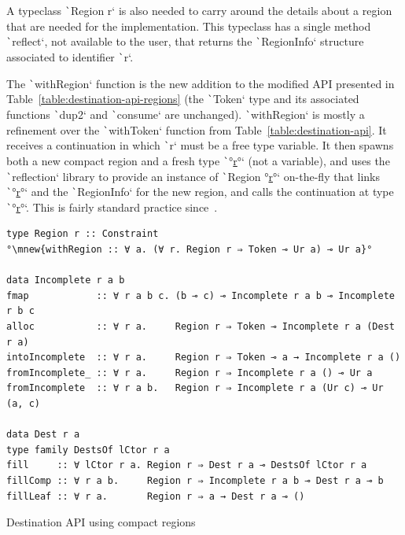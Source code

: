\documentclass[english]{jflart}
\newcommand{\mnew}[1]{\colorbox{green!50}{#1}}
\newcommand{\muline}[1]{\uline{#1}}
\begin{document}
A typeclass \texttt`Region r` is also needed to carry around the details about a region that are needed for the implementation. This typeclass has a single method \texttt`reflect`, not available to the user, that returns the \texttt`RegionInfo` structure associated to identifier \texttt`r`.

The \texttt`withRegion` function is the new addition to the modified API presented in Table~\ref{table:destination-api-regions} (the \texttt`Token` type and its associated functions \texttt`dup2` and \texttt`consume` are unchanged). \texttt`withRegion` is mostly a refinement over the \texttt`withToken` function from Table~\ref{table:destination-api}. It receives a continuation in which \texttt`r` must be a free type variable. It then spawns both a new compact region and a fresh type \texttt`°\muline{r}°` (not a variable), and uses the \texttt`reflection` library to provide an instance of \texttt`Region °\muline{r}°` on-the-fly that links \texttt`°\muline{r}°` and the \texttt`RegionInfo` for the new region, and calls the continuation at type \texttt`°\muline{r}°`. This is fairly standard practice since~\cite{launchbury_lazy_1994}.

\begin{table}[t]
\small
\begin{verbatim}
type Region r :: Constraint
°\mnew{withRegion :: ∀ a. (∀ r. Region r ⇒ Token ⊸ Ur a) ⊸ Ur a}°

data Incomplete r a b
fmap            :: ∀ r a b c. (b ⊸ c) ⊸ Incomplete r a b ⊸ Incomplete r b c
alloc           :: ∀ r a.     Region r ⇒ Token ⊸ Incomplete r a (Dest r a)
intoIncomplete  :: ∀ r a.     Region r ⇒ Token ⊸ a → Incomplete r a ()
fromIncomplete_ :: ∀ r a.     Region r ⇒ Incomplete r a () ⊸ Ur a
fromIncomplete  :: ∀ r a b.   Region r ⇒ Incomplete r a (Ur c) ⊸ Ur (a, c)

data Dest r a
type family DestsOf lCtor r a
fill     :: ∀ lCtor r a. Region r ⇒ Dest r a ⊸ DestsOf lCtor r a
fillComp :: ∀ r a b.     Region r ⇒ Incomplete r a b ⊸ Dest r a ⊸ b
fillLeaf :: ∀ r a.       Region r ⇒ a → Dest r a ⊸ ()
\end{verbatim}
\caption{Destination API using compact regions}
\label{table:destination-api-regions}
\end{table}
\end{document}
